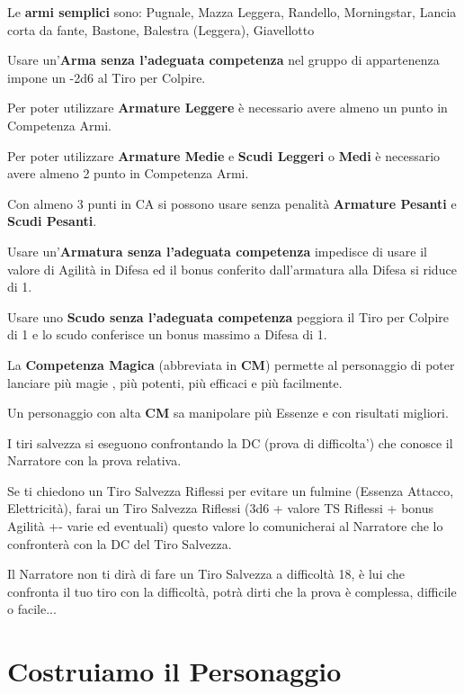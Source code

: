 \documentclass[a4paper,11pt,twoside,openany]{book}
\begin{document}
Le \textbf{armi semplici} sono: Pugnale, Mazza Leggera, Randello, Morningstar,
Lancia corta da fante, Bastone, Balestra (Leggera), Giavellotto

Usare un'\textbf{Arma senza l'adeguata competenza} nel gruppo di appartenenza impone un -2d6 al Tiro per Colpire.

Per poter utilizzare \textbf{Armature Leggere} è necessario avere almeno un punto in Competenza Armi.

Per poter utilizzare \textbf{Armature Medie} e \textbf{Scudi Leggeri} o \textbf{Medi} è necessario avere almeno 2 punto in Competenza Armi.

Con almeno 3 punti in CA si possono usare senza penalità \textbf{Armature Pesanti} e \textbf{Scudi Pesanti}.

Usare un'\textbf{Armatura senza l'adeguata competenza} impedisce di usare il valore di Agilità in Difesa ed il bonus conferito dall'armatura alla Difesa si riduce di 1.

Usare uno \textbf{Scudo senza l'adeguata competenza} peggiora il Tiro per Colpire di 1 e lo scudo conferisce un bonus massimo a Difesa di 1.

La \textbf{Competenza Magica} (abbreviata in \textbf{CM}) permette al personaggio di poter lanciare più magie , più potenti, più efficaci e più facilmente.

Un personaggio con alta \textbf{CM} sa manipolare più Essenze e con risultati migliori.

I tiri salvezza si eseguono confrontando la DC (prova di difficolta') che conosce il Narratore con la prova relativa.

Se ti chiedono un Tiro Salvezza Riflessi per evitare un fulmine (Essenza Attacco, Elettricità), farai un Tiro Salvezza Riflessi (3d6 + valore TS Riflessi + bonus Agilità +- varie ed eventuali) questo valore lo comunicherai al Narratore che lo confronterà con la DC del Tiro Salvezza.

Il Narratore non ti dirà di fare un Tiro Salvezza a difficoltà 18, è lui che confronta il tuo tiro con la difficoltà, potrà dirti che la prova è complessa, difficile o facile...


\pagebreak

\section{Costruiamo il Personaggio}
\end{document}
